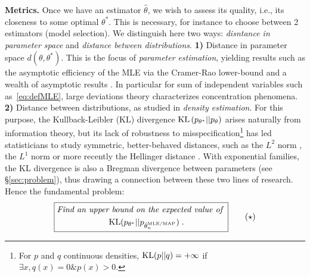 \documentclass[twoside]{article}
\newcommand{\nat}{\theta}
\begin{document}
{\bf Metrics.}
Once we have an estimator $\hat \nat$, we wish to assess its quality, i.e., its closeness to some optimal $\nat^*$.
This is necessary, for instance to choose between 2 estimators (model selection).
We distinguish here two ways: \textit{disntance in parameter space} and \textit{distance between distributions}.
{\bf 1)} Distance in parameter space $d(\nat,\nat^*)$. This is the focus of \emph{parameter estimation}, yielding results such as the asymptotic efficiency of the MLE via the Cramer-Rao lower-bound \citep{aitken1942estimation} and a wealth of asymptotic results \citep{vdv1998asymptotic}.
In particular for sum of independent variables such as~\eqref{eq:defMLE}, large deviations theory \citep{varadhan1984large} characterizes concentration phenomena.
{\bf 2)} Distance between distributions, as studied in \emph{density estimation}.
For this purpose, the Kullback-Leibler (KL) divergence $\KL\paren{p_{\nat^*} || p_{\nat} }$  arises naturally from information theory,
but its lack of robustness to misspecification\footnote{
For $p$ and $q$ continuous densities,
$\mathrm{KL}(p||q) = +\infty$ if $\exists x, q(x)=0 \&p(x)>0$. 
}
has led statisticians to study symmetric, better-behaved distances, such as the $L^2$ norm \citep[\S1.2]{tsybakov2009introduction}, the $L^1$ norm \citep{devroye2001combinatorial} or more recently the Hellinger distance \citep{baraud2017new}.
With exponential families, the KL divergence is also a Bregman divergence between parameters (see \S\ref{sec:problem}), thus drawing a connection between these two lines of research.
Hence the fundamental problem:
\begin{equation}
\boxed{
\begin{aligned}
	\textit{Find an upper}&\textit{ bound on the expected value of } \\
	&\KL(p_{\nat^*} || p_{\hat \nat_n^\text{MLE/MAP} }) \; .
\end{aligned}
}
\tag{$\star$}
\label{problem}
\end{equation}
\end{document}

